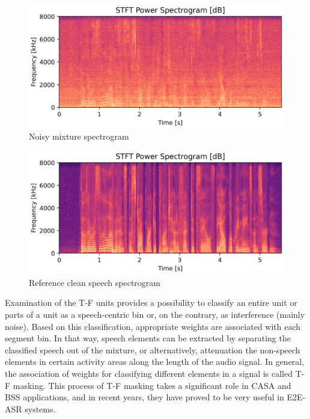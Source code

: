 \begin{figure}[H]
    \centering
    \includegraphics[width=\linewidth]{Features/images/noisy_specgram}
    \caption{Noisy mixture spectrogram}\label{fig:noisy_specgram}
\end{figure}
\begin{figure}[H]
    \centering
    \includegraphics[width=\linewidth]{Features/images/clean_specgram}
    \caption{Reference clean speech spectrogram}\label{fig:clean_specgram}
\end{figure}

Examination of the T-F units provides a 
possibility to classify an entire unit
or parts of a unit 
as a speech-centric bin or, on the contrary, 
as interference (mainly noise). 
Based on this classification, 
appropriate weights are associated with each segment bin.
In that way, speech elements can be extracted 
by separating the classified speech 
out of the mixture, or alternatively, 
attenuation the non-speech elements 
in certain activity areas 
along the length of the audio signal.
In general, the association of weights for classifying different
elements in a signal is called T-F masking. 
This process of T-F masking takes a 
significant role in CASA and BSS applications, 
and in recent years, they have proved to be 
very useful in E2E-ASR systems.

